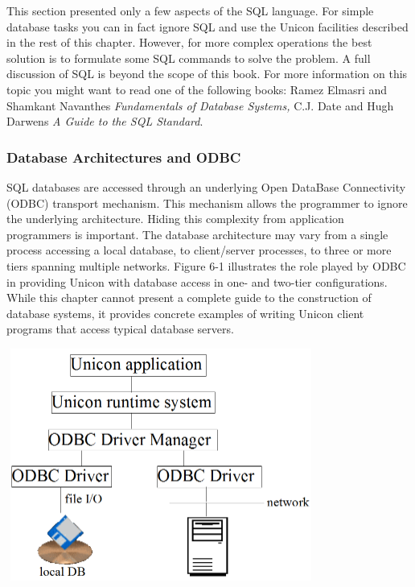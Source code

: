 This section presented only a few aspects of the SQL language. For
simple database tasks you can in fact ignore SQL and use the Unicon
facilities described in the rest of this chapter. However, for more
complex operations the best solution is to formulate some SQL commands
to solve the problem. A full discussion of SQL is beyond the scope of
this book. For more information on this topic you might want to read
one of the following books: Ramez Elmasri and Shamkant
Navanthe{\textquotesingle}s \textit{Fundamentals of Database Systems,}
C.J. Date and Hugh Darwen{\textquotesingle}s \textit{A Guide to the SQL
Standard}.

\subsubsection[Database Architectures and ODBC]{Database Architectures
and ODBC}

SQL databases are accessed through an underlying Open
DataBase Connectivity (ODBC) transport mechanism. This mechanism allows
the programmer to ignore the underlying architecture. Hiding this
complexity from application programmers is important. The database
architecture may vary from a single process accessing a local database,
to client/server processes, to three or more tiers spanning multiple
networks. Figure 6-1 illustrates the role played by ODBC in providing
Unicon with database access in one- and two-tier configurations. While
this chapter cannot present a complete guide to the construction of
database systems, it provides concrete examples of writing Unicon
client programs that access typical database servers.

\begin{center}
\includegraphics[width=4in,height=3in]{ub-img/odbcarch.png}
\end{center}

